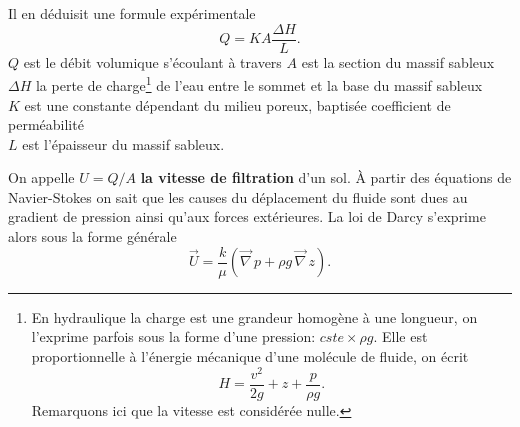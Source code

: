 \documentclass[a4paper,11pt]{article}
\numberwithin{equation}{section}
\begin{document}
Il en déduisit une formule expérimentale
\begin{equation}
	\label{eq-Darcy-1}
	Q=KA\frac{\Delta H}{L}.
\end{equation}
$Q$ est le débit volumique s'écoulant à travers  
$A$ est la section du massif sableux\\
$\Delta H$ la perte de charge\footnote{En hydraulique la charge est une grandeur homogène à une longueur, on l'exprime parfois sous la forme d'une pression: $cste\times\rho g$. Elle est proportionnelle à l'énergie mécanique d'une molécule de fluide, on écrit \[H=\frac{v^2}{2g}+ z+ \frac{p}{\rho g}.\] Remarquons ici que la vitesse est considérée nulle.} de l'eau entre le sommet et la base du massif sableux\\
$K$ est une constante dépendant du milieu poreux, baptisée coefficient de perméabilité\\
$L$ est l'épaisseur du massif sableux.



\vspace{0.7cm}

On appelle $U=Q/A$ \textbf{la vitesse de filtration} d'un sol. À partir des équations de Navier-Stokes on sait que les causes du déplacement du fluide sont dues au gradient de pression ainsi qu'aux forces extérieures. La loi de Darcy s'exprime alors sous la forme générale
\begin{equation}
	\label{eq-Darcy}
	\overrightarrow{U}=\frac{k}{\mu }(\overrightarrow{\nabla}\, p+\rho g \,\overrightarrow{\nabla}\, z).
\end{equation} 
\end{document}
